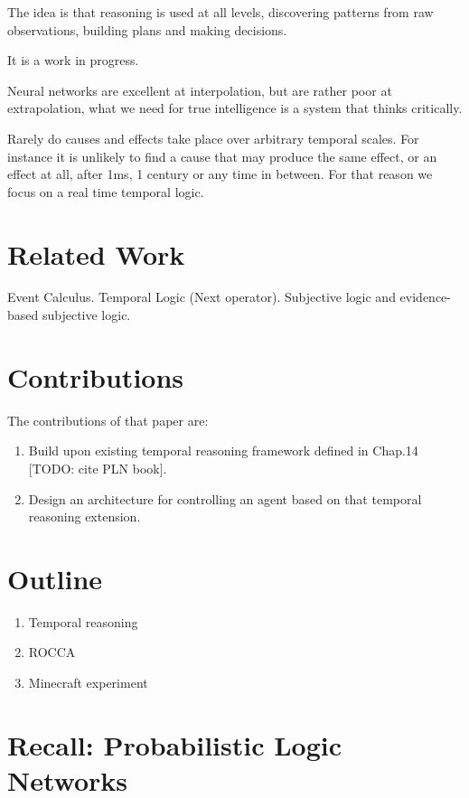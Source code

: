 \documentclass[runningheads]{llncs}
\begin{document}
The idea is that reasoning is used at all levels, discovering patterns
from raw observations, building plans and making decisions.

It is a work in progress.

Neural networks are excellent at interpolation, but are rather poor at
extrapolation, what we need for true intelligence is a system that
thinks critically.

Rarely do causes and effects take place over arbitrary temporal
scales.  For instance it is unlikely to find a cause that may produce
the same effect, or an effect at all, after 1ms, 1 century or any time
in between.  For that reason we focus on a real time temporal logic.

\section{Related Work}

Event Calculus.  Temporal Logic (Next operator).  Subjective logic and
evidence-based subjective logic.

\section{Contributions}

The contributions of that paper are:
\begin{enumerate}
\item Build upon existing temporal reasoning framework defined in
  Chap.14 [TODO: cite PLN book].
\item Design an architecture for controlling an agent based on that
  temporal reasoning extension.
\end{enumerate}

\section{Outline}

\begin{enumerate}
\item Temporal reasoning
\item ROCCA
\item Minecraft experiment
\end{enumerate}

\section{Recall: Probabilistic Logic Networks}
\end{document}
